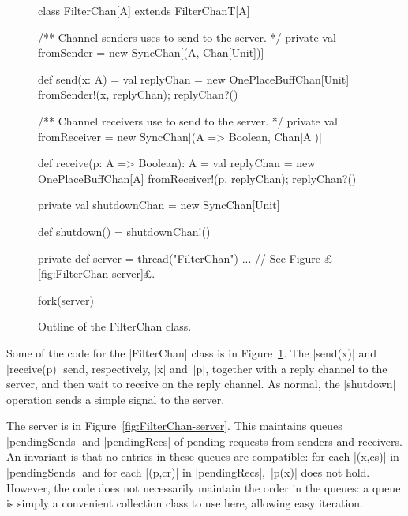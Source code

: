 \begin{figure}
\begin{scala}
class FilterChan[A] extends FilterChanT[A]{
  /** Channel senders uses to send to the server. */
  private val fromSender = new SyncChan[(A, Chan[Unit])]

  def send(x: A) = { 
    val replyChan = new OnePlaceBuffChan[Unit]
    fromSender!(x, replyChan); replyChan?()
  }

  /** Channel receivers use to send to the server. */
  private val fromReceiver = new SyncChan[(A => Boolean, Chan[A])]
  
  def receive(p: A => Boolean): A = {
    val replyChan = new OnePlaceBuffChan[A]
    fromReceiver!(p, replyChan); replyChan?()
  }

  private val shutdownChan = new SyncChan[Unit]

  def shutdown() = shutdownChan!() 

  private def server = thread("FilterChan"){ ... } // See Figure £\ref{fig:FilterChan-server}£.

  fork(server)
}
\end{scala}
\caption{Outline of the {\scalashape FilterChan} class.}
\label{fig:FilterChan}
\end{figure}


Some of the code for the |FilterChan| class is in
Figure~\ref{fig:FilterChan}.  The |send(x)| and |receive(p)| send,
respectively, |x| and~|p|, together with a reply channel to the server, and
then wait to receive on the reply channel.  As normal, the |shutdown|
operation sends a simple signal to the server. 

\pagebreak[2]

The server is in Figure~\ref{fig:FilterChan-server}.  This maintains queues
|pendingSends| and |pendingRecs| of pending requests from senders and
receivers.  An invariant is that no entries in these queues are compatible:
for each |(x,cs)| in |pendingSends| and for each |(p,cr)| in |pendingRecs|,\,
|p(x)| does not hold.  However, the code does not necessarily maintain the
order in the queues: a queue is simply a convenient collection class to use
here, allowing easy iteration. 


